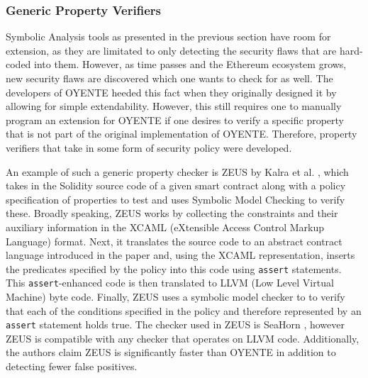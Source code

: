 \documentclass[letterpaper,twocolumn,10pt]{article}
\begin{document}
\subsubsection{Generic Property Verifiers}
Symbolic Analysis tools as presented in the previous section have room for extension, as they are  limitated to only detecting the security flaws that are hard-coded into them. However, as time passes and the Ethereum ecosystem grows, new security flaws are discovered which one wants to check for as well. The developers of OYENTE heeded this fact when they originally designed it by allowing for simple extendability. However, this still requires one to manually program an extension for OYENTE if one desires to verify a specific property that is not part of the original implementation of OYENTE. Therefore, property verifiers that take in some form of security policy were developed.


An example of such a generic property checker is ZEUS by Kalra et al. \cite{kalra_goel_dhawan_sharma_2018}, which takes in the Solidity source code of a given smart contract along with a policy specification of properties to test and uses Symbolic Model Checking to verify these. Broadly speaking, ZEUS works by collecting the constraints and their auxiliary information in the XCAML (eXtensible Access Control Markup Language) format. Next, it translates the source code to an abstract contract language introduced in the paper and, using the XCAML representation, inserts the predicates specified by the policy into this code using \verb|assert| statements. This \verb|assert|-enhanced code is then translated to LLVM (Low Level Virtual Machine) \cite{lattner_adve} byte code. Finally, ZEUS uses a symbolic model checker to to verify that each of the conditions specified in the policy and therefore represented by an \verb|assert| statement holds true. The checker used in ZEUS is SeaHorn \cite{gurfinkel_kahsai_komuravelli_navas_2015}, however ZEUS is compatible with any checker that operates on LLVM code. Additionally, the authors claim ZEUS is significantly faster than OYENTE in addition to detecting fewer false positives.
\end{document}
